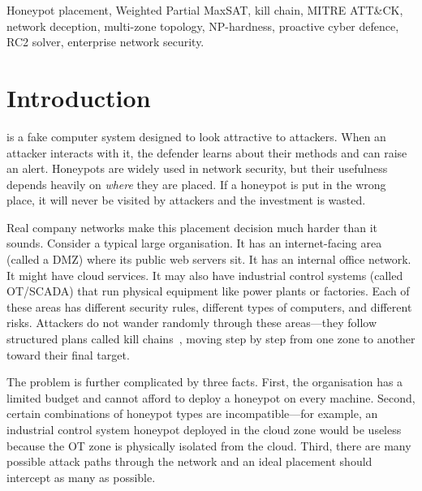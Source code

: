 \documentclass[journal]{IEEEtran}
\begin{document}
\begin{IEEEkeywords}
Honeypot placement, Weighted Partial MaxSAT, kill chain,
MITRE ATT\&CK, network deception, multi-zone topology,
NP-hardness, proactive cyber defence, RC2 solver, enterprise
network security.
\end{IEEEkeywords}

\section{Introduction}
\label{sec:intro}

 is a fake computer system
designed to look attractive to attackers.
When an attacker interacts with it, the defender learns about
their methods and can raise an alert.
Honeypots are widely used in network security, but their
usefulness depends heavily on \emph{where} they are placed.
If a honeypot is put in the wrong place, it will never be
visited by attackers and the investment is wasted.

Real company networks make this placement decision much
harder than it sounds.
Consider a typical large organisation.
It has an internet-facing area (called a DMZ) where its
public web servers sit.
It has an internal office network.
It might have cloud services.
It may also have industrial control systems (called OT/SCADA)
that run physical equipment like power plants or factories.
Each of these areas has different security rules, different
types of computers, and different risks.
Attackers do not wander randomly through these areas---they
follow structured plans called kill chains~\cite{hutchins2011},
moving step by step from one zone to another toward their
final target.

The problem is further complicated by three facts.
First, the organisation has a limited budget and cannot afford
to deploy a honeypot on every machine.
Second, certain combinations of honeypot types are
incompatible---for example, an industrial control system
honeypot deployed in the cloud zone would be useless because
the OT zone is physically isolated from the cloud.
Third, there are many possible attack paths through the
network and an ideal placement should intercept as many as
possible.
\end{document}
